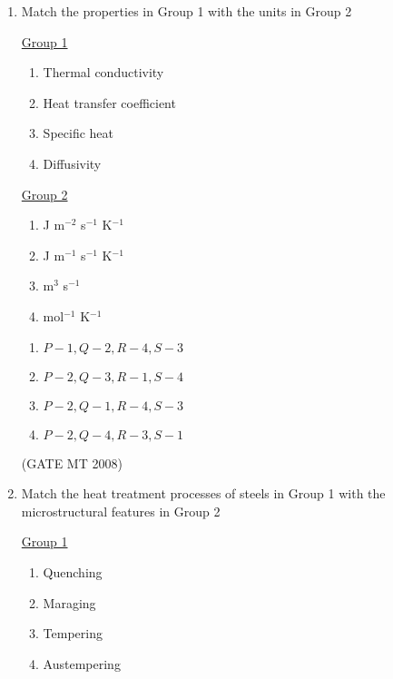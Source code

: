 \documentclass[11pt, letterpaper]{article}
\theoremstyle{remark}
\begin{document}
\begin{enumerate}[label=Q.\arabic*]
\item Match the properties in Group 1 with the units in Group 2
\begin{multicols}{2}
    \underline{Group 1}
    \begin{enumerate}[label=(\Alph*), start=16]
        \item Thermal conductivity
        \item Heat transfer coefficient 
        \item Specific heat
        \item Diffusivity 
    \end{enumerate}

     \underline{Group 2}
    \begin{enumerate}[label=(\arabic*), start=1]
        \item J m$^{-2}$ s$^{-1}$ K$^{-1}$
        \item J m$^{-1}$ s$^{-1}$ K$^{-1}$ 
        \item m$^3$ s$^{-1}$
        \item mol$^{-1}$ K$^{-1}$
    \end{enumerate}
\end{multicols}
\vspace{-2em}
    \begin{multicols}{2}
        \begin{enumerate}[label=(\MakeUppercase{\alph*})]
            \item $P-1, Q-2, R-4, S-3$
            \item $P-2, Q-3, R-1, S-4$
            \item $P-2, Q-1, R-4, S-3$
            \item $P-2, Q-4, R-3, S-1$
        \end{enumerate}
    \end{multicols}
    \vspace{-5mm}
  \hfill(GATE MT 2008) 
  
\item Match the heat treatment processes of steels in Group 1 with the microstructural features in Group 2
\begin{multicols}{2}
    \underline{Group 1}
    \begin{enumerate}[label=(\Alph*), start=16]
        \item Quenching
        \item Maraging 
        \item Tempering
        \item Austempering
    \end{enumerate}


\end{multicols}
\end{enumerate}
\end{document}
